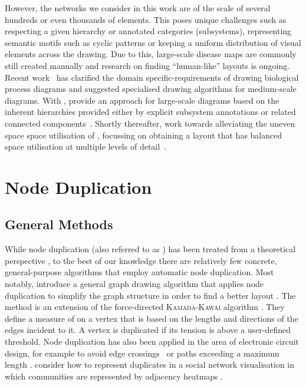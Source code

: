 \documentclass[
	fontsize=10pt, %
	twoside=true, %
	secnumdepth=1, %
  toc=indentunnumbered %
]{kaobook}
\begin{document}
However, the networks we consider in this work are of the scale of several
hundreds or even thousands of elements. This poses unique challenges such as
respecting a given hierarchy or annotated categories (subsystems), representing semantic
motifs such as cyclic patterns or keeping a uniform distribution of visual
elements across the drawing. Due to this, large-scale disease maps are commonly
still created manually 
\cite{nielsen_MachineLearningSupport_2019,fujita_IntegratingPathwaysParkinson_2014}
and research on finding ``human-like'' layouts is ongoing.
%
Recent work~\cite{siebenhaller_HumanlikeLayoutAlgorithms_2020,
  kieffer_HOLAHumanlikeOrthogonal_2016} has clarified the domain
specific-requirements of drawing biological process diagrams and suggested
specialised drawing algorithms for medium-scale diagrams.
%
With , \citeauthor{wu_MetabopolisScalableNetwork_2019}
provide an approach for large-scale diagrams based on the inherent hierarchies
provided either by explicit subsystem annotations or related connected
components~\cite{wu_MetabopolisScalableNetwork_2019}.
%
Shortly thereafter, \citeauthor{wu_MultilevelAreaBalancing_2020} work towards
alleviating the uneven space space utilisation of ,
focussing on obtaining a layout that has balanced space utilisation at multiple
levels of detail~\cite{wu_MultilevelAreaBalancing_2020}.




\section{Node Duplication}
\label{sec:node-duplication}

\subsection{General Methods}
While node duplication (also referred to as
) has been treated from a theoretical perspective
\cite{liebers_PlanarizingGraphsSurvey_2001,abu-khzam_ClusterEditingVertex_2018},
to the best of our knowledge there are relatively few concrete, general-purpose
algorithms that employ automatic node duplication.
%
Most notably, \citeauthor{eades_VertexSplittingTensionfree_1996} introduce a
general graph drawing algorithm that applies node duplication to simplify the
graph structure in order to find a better layout
\cite{eades_VertexSplittingTensionfree_1996}. The method is an extension of the
force-directed \textsc{Kamada-Kawai} algorithm
\cite{kamada_AlgorithmDrawingGeneral_1989}. They define a measure of
 on a vertex that is based on the lengths and directions of the
edges incident to it. A vertex is duplicated if its tension is above a
user-defined threshold.
%
Node duplication has also been applied in the area of electronic circuit design,
for example to avoid edge crossings~\cite{li_EliminateWireCrossings_2008} or
paths exceeding a maximum length
\cite{paik_VertexSplittingDags_1998}.
%
\citeauthor{henr_ImprovingReadabilityClustered_2008}
 consider how to represent
duplicates in a social network visualisation in which communities are
represented by adjacency heatmaps
\cite{henr_ImprovingReadabilityClustered_2008}.
\end{document}
